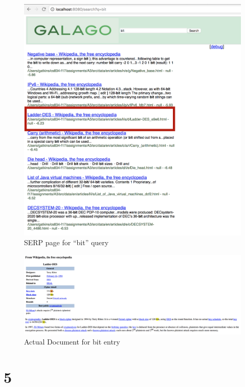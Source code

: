 \documentclass[letterpaper,11pt]{article}
\begin{document}
\begin{figure}[h]
\centering
\includegraphics[scale=0.4]{galago3.png}
\caption{SERP page for ``bit'' query}
\label{fig:g3}
\end{figure}

\begin{figure}[h]
\centering
\includegraphics[scale=0.4]{g3.png}
\caption{Actual Document for bit entry}
\label{fig:g32}
\end{figure}

\clearpage


\section*{5}
\end{document}
